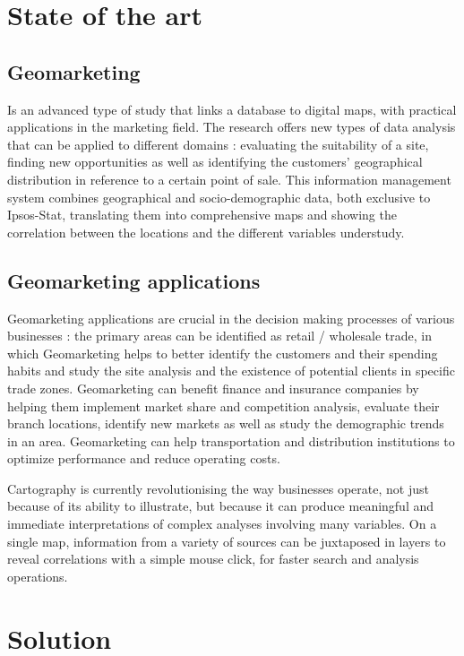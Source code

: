 
\section{State of the art}
\subsection{Geomarketing}
Is an advanced type of study that links a database to digital maps, with
practical applications in the marketing field. The research offers new types of
data analysis that can be applied to different domains : evaluating the
suitability of a site, finding new opportunities as well as identifying the
customers' geographical distribution in reference to a certain point of sale.
This information management system combines geographical and socio-demographic
data, both exclusive to Ipsos-Stat, translating them into comprehensive maps and
showing the correlation between the locations and the different variables understudy.

\subsection{Geomarketing applications}
Geomarketing applications are crucial in the decision making processes of
various businesses : the primary areas can be identified as retail / wholesale
trade, in which Geomarketing helps to better identify the customers and their
spending habits and study the site analysis and the existence of potential
clients in specific trade zones. Geomarketing can benefit finance and insurance
companies by helping them implement market share and competition analysis,
evaluate their branch locations, identify new markets as well as study the
demographic trends in an area. Geomarketing can help transportation and
distribution institutions to optimize performance and reduce operating costs.

Cartography is currently revolutionising the way businesses operate, not just
because of its ability to illustrate, but because it can produce meaningful and
immediate interpretations of complex analyses involving many variables. On a
single map, information from a variety of sources can be juxtaposed in layers to
reveal correlations with a simple mouse click, for faster search and analysis
operations.

\section{Solution}

